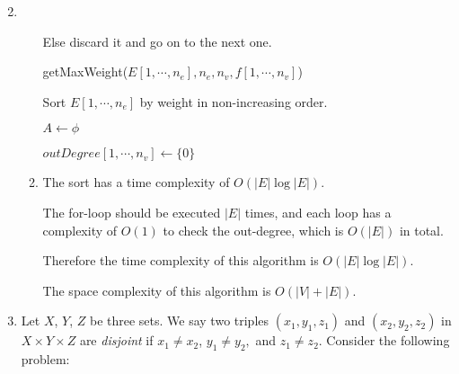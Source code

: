 \documentclass[12pt,a4paper]{article}
\makeatletter
\newtheorem*{solution}{Solution}
\theoremstyle{definition}
\renewenvironment{solution}[1][Solution] {\par\pushQED{\qed}\normalfont\topsep6\p@\@plus6\p@\relax\trivlist\item[\hskip\labelsep\bfseries#1\@addpunct{.}]\ignorespaces}{\popQED\endtrivlist\@endpefalse} \makeatother
\makeatother
\begin{document}
\begin{enumerate}
\begin{solution}
\begin{enumerate}
    	        Else discard it and go on to the next one.
    	        
    	        \begin{minipage}[t]{0.90\textwidth}
    	        	\begin{algorithm}[H]
    	        		\BlankLine
    	        		\caption{getMaxWeight($E[1,\cdots,n_e],n_e,n_v,f[1,\cdots,n_v]$)}
    	        		\label{Alg-getMaxWeight}
    	        		
    	        		Sort $E[1,\cdots,n_e]$ by weight in non-increasing order.
    	        		
    	        		$A \leftarrow \phi$\;
    	        		
    	        		$outDegree[1,\cdots,n_v]\leftarrow \{0\}$\;
    	        		
    	        		
    	        		\;
    	        		
    	        	\end{algorithm}
    	        \end{minipage}
            \item 
                The sort has a time complexity of $O(|E|\log |E|)$.
                
                The for-loop should be executed $|E|$ times, and each loop has a complexity of $O(1)$ to check the out-degree, which is $O(|E|)$ in total.
                
                Therefore the time complexity of this algorithm is $O(|E|\log |E|)$.
                
                The space complexity of this algorithm is $O(|V|+|E|)$.
    		        
    	\end{enumerate}
       
    \end{solution}


\item Let $X$, $Y$, $Z$ be three sets. We say two triples $\left(x_{1}, y_{1}, z_{1}\right)$ and $\left(x_{2}, y_{2}, z_{2}\right)$ in $X \times Y \times Z$ are \textit{disjoint} if $x_{1} \neq x_{2}$, $y_{1} \neq y_{2},$ and $z_{1} \neq z_{2}$. Consider the following problem:
    

\end{enumerate}
\end{document}
